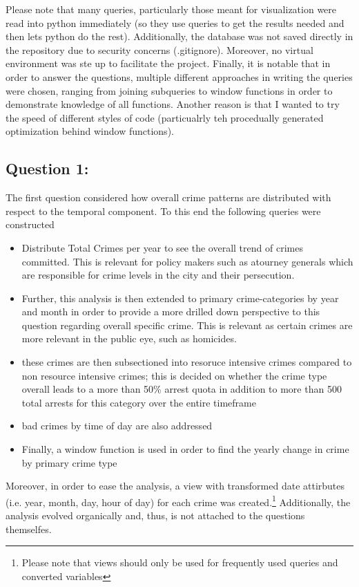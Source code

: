 \documentclass[a4paper]{article}
\begin{document}
Please note that many queries, particularly those meant for visualization were read into python immediately (so they use queries to get the results needed and then lets python do the rest). Additionally, the database was not saved directly in the repository due to security concerns (.gitignore). Moreover, no virtual environment was ste up to facilitate the project. Finally, it is notable that in order to answer the questions, multiple different approaches in writing the queries were chosen, ranging from joining subqueries to window functions in order to demonstrate knowledge of all functions. Another reason is that I wanted to try the speed of different styles of code (particualrly teh procedually generated optimization behind window functions).

\subsection{Question 1:}

The first question considered how overall crime patterns are distributed with respect to the temporal component. To this end the following queries were constructed 
\begin{itemize}
  \item Distribute Total Crimes per year to see the overall trend of crimes committed. This is relevant for policy makers such as atourney generals which are responsible for crime levels in the city and their persecution. 
  \item Further, this analysis is then extended to primary crime-categories by year and month in order to provide a more drilled down perspective to this question regarding overall specific crime. This is relevant as certain crimes are more relevant in the public eye, such as homicides. 
  \item these crimes are then subsectioned into resoruce intensive crimes compared to non resource intensive crimes; this is decided on whether the crime type overall leads to a more than 50\% arrest quota in addition to more than 500 total arrests for this category over the entire timeframe
  \item bad crimes by time of day are also addressed 
  \item Finally, a window function is used in order to find the yearly change in crime by primary crime type 
\end{itemize}


Moreover, in order to ease the analysis, a view with transformed date attirbutes (i.e. year, month, day, hour of day) for each crime was created.\footnote{Please note that views should only be used for frequently used queries and converted variables}
Additionally, the analysis evolved organically and, thus, is not attached to the questions themselfes. 
\end{document}
